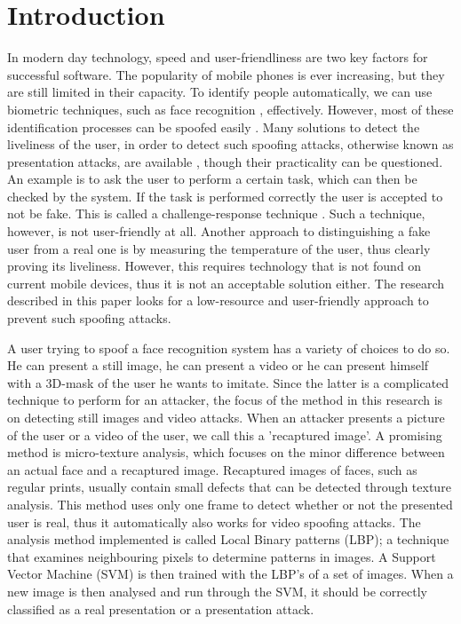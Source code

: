 \documentclass{sig-alternate-br}
\begin{document}
\section{Introduction} \label{introduction}
In modern day technology, speed and user-friendliness are two key factors for successful software. The popularity of mobile phones is ever increasing, but they are still limited in their capacity. To identify people automatically, we can use biometric techniques, such as face recognition \cite{zhao2003face}, effectively. However, most of these identification processes can be spoofed easily \cite{anjos2014face}. Many solutions to detect the liveliness of the user, in order to detect such spoofing attacks, otherwise known as presentation attacks, are available \cite{bao2009liveness}, though their practicality can be questioned. An example is to ask the user to perform a certain task, which can then be checked by the system. If the task is performed correctly the user is accepted to not be fake. This is called a challenge-response technique \cite{bolle2005system}. Such a technique, however, is not user-friendly at all. Another approach to distinguishing a fake user from a real one is by measuring the temperature of the user, thus clearly proving its liveliness. However, this requires technology that is not found on current mobile devices, thus it is not an acceptable solution either. The research described in this paper looks for a low-resource and user-friendly approach to prevent such spoofing attacks.

A user trying to spoof a face recognition system has a variety of choices to do so. He can present a still image, he can present a video or he can present himself with a 3D-mask of the user he wants to imitate. Since the latter is a complicated technique to perform for an attacker, the focus of the method in this research is on detecting still images and video attacks. When an attacker presents a picture of the user or a video of the user, we call this a 'recaptured image'. A promising method is micro-texture analysis, which focuses on the minor difference between an actual face and a recaptured image. Recaptured images of faces, such as regular prints, usually contain small defects that can be detected through texture analysis. This method uses only one frame to detect whether or not the presented user is real, thus it automatically also works for video spoofing attacks. The analysis method implemented is called Local Binary patterns (LBP); a technique that examines neighbouring pixels to determine patterns in images. A Support Vector Machine (SVM) is then trained with the LBP's of a set of images. When a new image is then analysed and run through the SVM, it should be correctly classified as a real presentation or a presentation attack.
\end{document}
